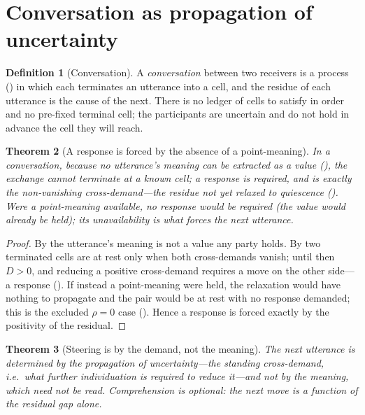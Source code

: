 \documentclass[twocolumn,11pt,a4paper]{article}
\theoremstyle{sup}
\newtheorem{theorem}{Theorem}[section]
\theoremstyle{definition}
\newtheorem{definition}[theorem]{Definition}
\theoremstyle{remark}
\newcommand{\res}{\rho}
\newcommand{\dem}{D}
\begin{document}
\section{Conversation as propagation of uncertainty}
\label{sec:conversation}

\begin{definition}[Conversation]
\label{def:conversation}
A \emph{conversation} between two receivers is a process () in
which each terminates an utterance into a cell, and the residue of each
utterance is the cause of the next. There is no ledger of cells to satisfy in
order and no pre-fixed terminal cell; the participants are uncertain and do not
hold in advance the cell they will reach.
\end{definition}

\begin{theorem}[A response is forced by the absence of a point-meaning]
\label{thm:response}
In a conversation, because no utterance's meaning can be extracted as a value
(), the exchange cannot terminate at a known cell; a
response is required, and is exactly the non-vanishing cross-demand---the residue
not yet relaxed to quiescence (). Were a point-meaning available,
no response would be required (the value would already be held); its
unavailability is what forces the next utterance.
\end{theorem}

\begin{proof}
By  the utterance's meaning is not a value any party
holds. By  two terminated cells are at rest only when both
cross-demands vanish; until then $\dem>0$, and reducing a positive cross-demand
requires a move on the other side---a response (). If instead a
point-meaning were held, the relaxation would have nothing to propagate and the
pair would be at rest with no response demanded; this is the excluded $\res=0$
case (). Hence a response is forced exactly by the positivity of
the residual.
\end{proof}

\begin{theorem}[Steering is by the demand, not the meaning]
\label{thm:steer}
The next utterance is determined by the propagation of uncertainty---the standing
cross-demand, i.e.\ what further individuation is required to reduce
it---and not by the meaning, which need not be read. Comprehension is optional:
the next move is a function of the residual gap alone.
\end{theorem}
\end{document}
